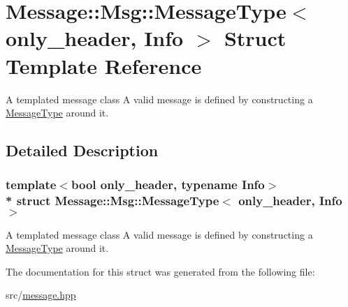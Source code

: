 \hypertarget{struct_message_1_1_msg_1_1_message_type}{}\section{Message\+:\+:Msg\+:\+:Message\+Type$<$ only\+\_\+header, Info $>$ Struct Template Reference}
\label{struct_message_1_1_msg_1_1_message_type}


A templated message class A valid message is defined by constructing a \hyperlink{struct_message_1_1_msg_1_1_message_type}{Message\+Type} around it.  




\subsection{Detailed Description}
\subsubsection*{template$<$bool only\+\_\+header, typename Info$>$\\*
struct Message\+::\+Msg\+::\+Message\+Type$<$ only\+\_\+header, Info $>$}

A templated message class A valid message is defined by constructing a \hyperlink{struct_message_1_1_msg_1_1_message_type}{Message\+Type} around it. 

The documentation for this struct was generated from the following file\+:\begin{DoxyCompactItemize}
\item 
src/\hyperlink{message_8hpp}{message.\+hpp}\end{DoxyCompactItemize}
